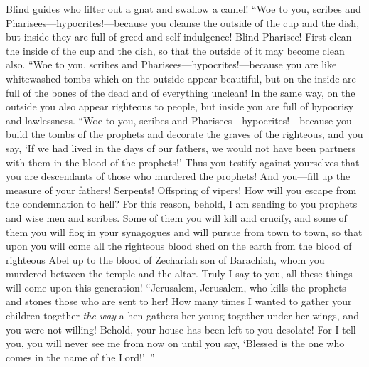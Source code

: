 \begin{biblechapter}
\verse Blind guides who filter out a gnat and swallow a camel!
\verse “Woe to you, scribes and Pharisees—hypocrites!—because you cleanse the outside of the cup and the dish, but inside they are full of greed and self-indulgence!
\verse Blind Pharisee! First clean the inside of the cup and the dish, so that the outside of it may become clean also.
\verse “Woe to you, scribes and Pharisees—hypocrites!—because you are like whitewashed tombs which on the outside appear beautiful, but on the inside are full of the bones of the dead and of everything unclean!
\verse In the same way, on the outside you also appear righteous to people, but inside you are full of hypocrisy and lawlessness.
\verse “Woe to you, scribes and Pharisees—hypocrites!—because you build the tombs of the prophets and decorate the graves of the righteous,
\verse and you say, ‘If we had lived in the days of our fathers, we would not have been partners with them in the blood of the prophets!’
\verse Thus you testify against yourselves that you are descendants of those who murdered the prophets!
\verse And you—fill up the measure of your fathers!
\verse Serpents! Offspring of vipers! How will you escape from the condemnation to hell?
\verse For this reason, behold, I am sending to you prophets and wise men and scribes. Some of them you will kill and crucify, and some of them you will flog in your synagogues and will pursue from town to town,
\verse so that upon you will come all the righteous blood shed on the earth from the blood of righteous Abel up to the blood of Zechariah son of Barachiah, whom you murdered between the temple and the altar.
\verse Truly I say to you, all these things will come upon this generation!
 “Jerusalem, Jerusalem, who kills the prophets and stones those who are sent to her! How many times I wanted to gather your children together \textit{the way} a hen gathers her young together under her wings, and you were not willing!
\verse Behold, your house has been left to you desolate!
\verse For I tell you, you will never see me from now on until you say, ‘Blessed is the one who comes in the name of the Lord!’ ”
\end{biblechapter}

